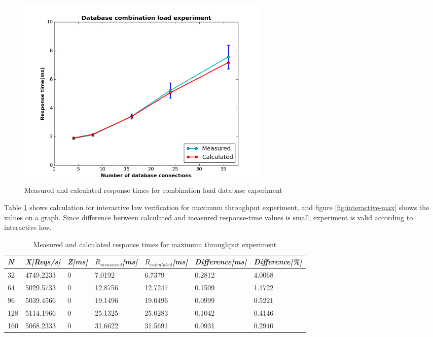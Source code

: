\documentclass[11pt]{article}
\begin{document}
\begin{figure}[H]
  \includegraphics[width=0.6\textwidth,page=1]{figures/interactive_law/db}
  \centering
  \caption{Measured and calculated response times for combination load database experiment}
  \label{fig:interactive-db}
\end{figure}



Table \ref{tbl:interactive-max} shows calculation for 
interactive law verification for maximum throughput experiment, and 
figure \ref{fig:interactive-max} shows the values on a graph. Since difference between calculated and 
measured response-time values is small, experiment is valid according to interactive law.

\begin{table}[!ht]
  \begin{tabular}{*7l}    \toprule
    \emph{N}   & \emph{X[Reqs/s]} & \emph{Z[ms]} & \emph{$R_{measured}$[ms]} & \emph{$R_{calculated}$[ms]} &   \emph{Difference[ms]} & \emph{Difference[\%]} \\\midrule
         32    & 4749.2233      & 0            & 7.0192 & 6.7379  &  0.2812 & 4.0068 \\
         64    & 5029.5733      & 0            & 12.8756& 12.7247 &  0.1509 & 1.1722 \\
         96    & 5039.4566      & 0            & 19.1496 &19.0496 &  0.0999 & 0.5221 \\
        128    & 5114.1966      & 0            & 25.1325 & 25.0283 & 0.1042 & 0.4146 \\
        160    & 5068.2333      & 0            & 31.6622 & 31.5691 & 0.0931 & 0.2940 \\
    \hline
  \end{tabular}
  \centering
  \caption{Measured and calculated response times for maximum throughput experiment}
  \label{tbl:interactive-max}
\end{table}
\end{document}
